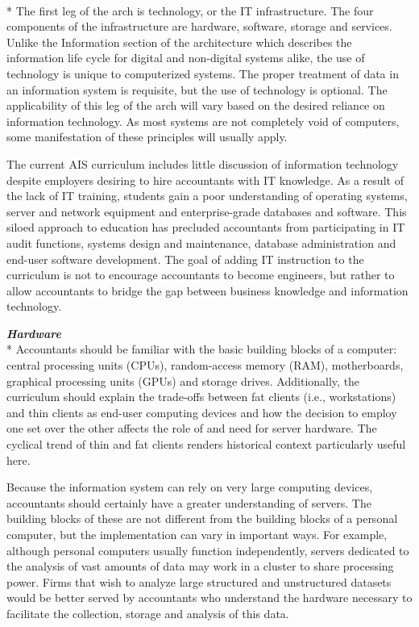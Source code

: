 \documentclass[12pt]{article}
\newcommand{\SubSection}[1]{\vspace{.15in}{\centering{}\normalsize{}\textbf{#1}}\\*\indent{}}
\newcommand{\SubSubSection}[1]{{\centering{}\normalsize{}\textbf{\emph{#1}}}\\*\indent{}}
\begin{document}
\SubSection{Technology}
The first leg of the arch is technology, or the IT infrastructure. The four components of the infrastructure are hardware, software, storage and services. Unlike the Information section of the architecture which describes the information life cycle for digital and non-digital systems alike, the use of technology is unique to computerized systems. The proper treatment of data in an information system is requisite, but the use of technology is optional. The applicability of this leg of the arch will vary based on the desired reliance on information technology. As most systems are not completely void of computers, some manifestation of these principles will usually apply.

The current AIS curriculum includes little discussion of information technology despite employers desiring to hire accountants with IT knowledge. As a result of the lack of IT training, students gain a poor understanding of operating systems, server and network equipment and enterprise-grade databases and software. This siloed approach to education has precluded accountants from participating in IT audit functions, systems design and maintenance, database administration and end-user software development. The goal of adding IT instruction to the curriculum is not to encourage accountants to become engineers, but rather to allow accountants to bridge the gap between business knowledge and information technology.

\SubSubSection{Hardware}
Accountants should be familiar with the basic building blocks of a computer: central processing units (CPUs), random-access memory (RAM), motherboards, graphical processing units (GPUs) and storage drives. Additionally, the curriculum should explain the trade-offs between fat clients (i.e., workstations) and thin clients as end-user computing devices and how the decision to employ one set over the other affects the role of and need for server hardware. The cyclical trend of thin and fat clients renders historical context particularly useful here.

Because the information system can rely on very large computing devices, accountants should certainly have a greater understanding of servers. The building blocks of these are not different from the building blocks of a personal computer, but the implementation can vary in important ways. For example, although personal computers usually function independently, servers dedicated to the analysis of vast amounts of data may work in a cluster to share processing power. Firms that wish to analyze large structured and unstructured datasets would be better served by accountants who understand the hardware necessary to facilitate the collection, storage and analysis of this data.
\end{document}
